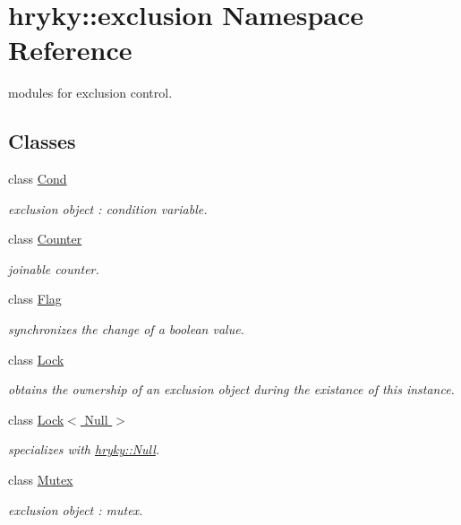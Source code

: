 \hypertarget{namespacehryky_1_1exclusion}{\section{hryky\-:\-:exclusion Namespace Reference}
\label{namespacehryky_1_1exclusion}
}


modules for exclusion control.  


\subsection*{Classes}
\begin{DoxyCompactItemize}
\item 
class \hyperlink{classhryky_1_1exclusion_1_1_cond}{Cond}
\begin{DoxyCompactList}\small\item\em exclusion object \-: condition variable. \end{DoxyCompactList}\item 
class \hyperlink{classhryky_1_1exclusion_1_1_counter}{Counter}
\begin{DoxyCompactList}\small\item\em joinable counter. \end{DoxyCompactList}\item 
class \hyperlink{classhryky_1_1exclusion_1_1_flag}{Flag}
\begin{DoxyCompactList}\small\item\em synchronizes the change of a boolean value. \end{DoxyCompactList}\item 
class \hyperlink{classhryky_1_1exclusion_1_1_lock}{Lock}
\begin{DoxyCompactList}\small\item\em obtains the ownership of an exclusion object during the existance of this instance. \end{DoxyCompactList}\item 
class \hyperlink{classhryky_1_1exclusion_1_1_lock_3_01_null_01_4}{Lock$<$ Null $>$}
\begin{DoxyCompactList}\small\item\em specializes with \hyperlink{classhryky_1_1_null}{hryky\-::\-Null}. \end{DoxyCompactList}\item 
class \hyperlink{classhryky_1_1exclusion_1_1_mutex}{Mutex}
\begin{DoxyCompactList}\small\item\em exclusion object \-: mutex. \end{DoxyCompactList}\item 

\end{DoxyCompactItemize}

